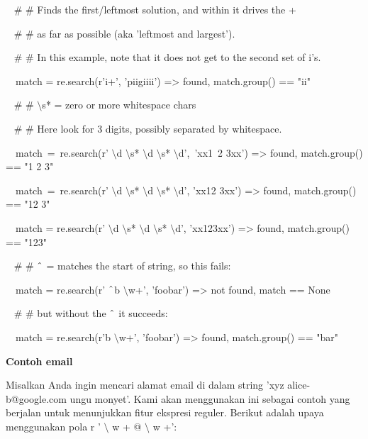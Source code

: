 \begin {enumerate}
\begin {enumerate}
\vspace{12pt}
\noindent
~  $  \#  $ $  \#  $ Finds the first/leftmost solution, and within it drives the + \par
\noindent
~  $  \#  $ $  \#  $ as far as possible (aka 'leftmost and largest'). \par
\noindent
~  $  \#  $ $  \#  $ In this example, note that it does not get to the second set of i's. \par
\noindent
~~match = re.search(r'i+', 'piigiiii') =>  found, match.group() == "ii" \par
\vspace{12pt}
\noindent
~  $  \#  $ $  \#  $  $  \setminus  $s* = zero or more whitespace chars \par
\noindent
~  $  \#  $ $  \#  $ Here look for 3 digits, possibly separated by whitespace. \par
\noindent
~~match~=~re.search(r' $  \setminus  $d $  \setminus  $s* $  \setminus  $d $  \setminus  $s* $  \setminus  $d',~'xx1~2   3xx') =>  found, match.group() == "1 2   3" \par
\noindent
~~match~=~re.search(r' $  \setminus  $d $  \setminus  $s* $  \setminus  $d $  \setminus  $s* $  \setminus  $d', 'xx12  3xx') =>  found, match.group() == "12  3" \par
\noindent
~~match = re.search(r' $  \setminus  $d $  \setminus  $s* $  \setminus  $d $  \setminus  $s* $  \setminus  $d', 'xx123xx') =>  found, match.group() == "123" \par
\vspace{12pt}
\noindent
~  $  \#  $ $  \#  $  $  \string^  $ = matches the start of string, so this fails: \par
\noindent
~~match = re.search(r' $  \string^  $b $  \setminus  $w+', 'foobar') =>  not found, match == None \par
\noindent
~  $  \#  $ $  \#  $ but without the  $  \string^  $ it succeeds: \par
\noindent
~~match = re.search(r'b $  \setminus  $w+', 'foobar') =>  found, match.group() == "bar" \par
\vspace{12pt}
\vspace{12pt}
\noindent
{\fontsize{14pt}{14pt}\selectfont \textbf{Contoh email} \\} \par
Misalkan Anda ingin mencari alamat email di dalam string 'xyz alice-b@google.com ungu monyet'. Kami akan menggunakan ini sebagai contoh yang berjalan untuk menunjukkan fitur ekspresi reguler. Berikut adalah upaya menggunakan pola r ' $  \setminus  $ w + @  $  \setminus  $ w +': \par

\end{enumerate}
\end{enumerate}

